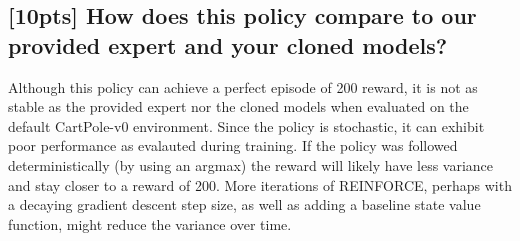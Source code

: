 \documentclass{article}
\begin{document}
\subsection{[10pts] How does this policy compare to our provided expert and your cloned models?}

Although this policy can achieve a perfect episode of 200 reward, it is not as stable as the provided expert nor the cloned models when evaluated on the default CartPole-v0 environment. Since the policy is stochastic, it can exhibit poor performance as evalauted during training. If the policy was followed deterministically (by using an argmax) the reward will likely have less variance and stay closer to a reward of 200. More iterations of REINFORCE, perhaps with a decaying gradient descent step size, as well as adding a baseline state value function, might reduce the variance over time.


\small
\medskip


\end{document}
